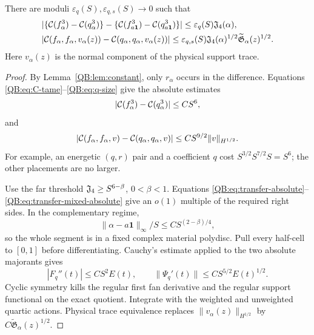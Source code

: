 \begin{theorem}
\label{QB:thm:transfer}
There are moduli $\varepsilon_q(S),\varepsilon_{q,s}(S)\to0$ such that
\begin{align}
 &|\{\mathcal C(f_\alpha^3)-\mathcal C(q_\alpha^3)\}
 -\{\mathcal C(f_{a\mathbf1}^3)-\mathcal C(q_{a\mathbf1}^3)\}|
 \le\varepsilon_q(S)\mathfrak J_4(\alpha),
 \label{QB:eq:transfer-fan}\\
 &|\mathcal C(f_\alpha,f_\alpha,v_\alpha(z))
 -\mathcal C(q_\alpha,q_\alpha,v_\alpha(z))|
 \le\varepsilon_{q,s}(S)\mathfrak J_4(\alpha)^{1/2}
 \widetilde{\mathfrak G}_\alpha(z)^{1/2}.
 \label{QB:eq:transfer-mixed}
\end{align}
Here $v_\alpha(z)$ is the normal component of the physical support trace.
\end{theorem}

\begin{proof}
By Lemma~\ref{QB:lem:constant}, only $r_\alpha$ occurs in the difference.
Equations \eqref{QB:eq:C-tame}--\eqref{QB:eq:q-size} give the absolute estimates
\begin{equation}\label{QB:eq:transfer-absolute}
 |\mathcal C(f_\alpha^3)-\mathcal C(q_\alpha^3)|\le CS^6,
\end{equation}
and
\begin{equation}\label{QB:eq:transfer-mixed-absolute}
 |\mathcal C(f_\alpha,f_\alpha,v)-\mathcal C(q_\alpha,q_\alpha,v)|
 \le CS^{9/2}\|v\|_{H^{1/2}}.
\end{equation}
For example, an energetic $(q,r)$ pair and a coefficient $q$ cost
$S^{3/2}S^{7/2}S=S^6$; the other placements are no larger.

Use the far threshold $\mathfrak J_4\ge S^{6-\beta}$, $0<\beta<1$.
Equations \eqref{QB:eq:transfer-absolute}--
\eqref{QB:eq:transfer-mixed-absolute} give an $o(1)$ multiple of the required
right sides.  In the complementary regime,
\begin{equation*}
 \|\alpha-a\mathbf1\|_\infty/S
 \le CS^{(2-\beta)/4},
\end{equation*}
so the whole segment is in a fixed complex material polydisc.  Pull every
half-cell to $[0,1]$ before differentiating.  Cauchy's estimate applied to
the two absolute majorants gives
\begin{equation*}
 |F_q''(t)|\le CS^2E(t),
 \qquad \|\Psi_q'(t)\|\le CS^{5/2}E(t)^{1/2}.
\end{equation*}
Cyclic symmetry kills the regular first fan derivative and the regular
support functional on the exact quotient.  Integrate with the weighted and
unweighted quartic actions.  Physical trace equivalence replaces
$\|v_\alpha(z)\|_{H^{1/2}}$ by
$C\widetilde{\mathfrak G}_\alpha(z)^{1/2}$.
\end{proof}

